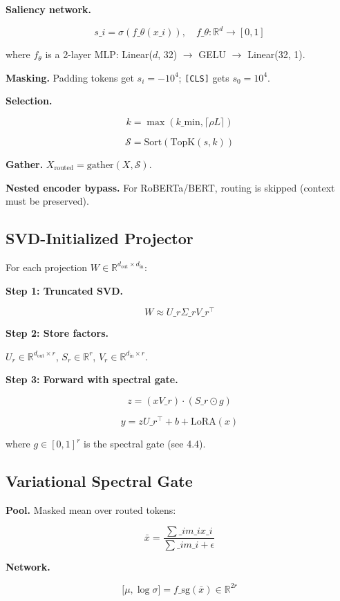 \textbf{Saliency network.}

\[
s\_i = \sigma(f\_\theta(x\_i)), \quad f\_\theta: \mathbb{R}^d \to [0, 1]
\tag{4.1}
\]

where $f_\theta$ is a 2-layer MLP: Linear($d$, 32) $\to$ GELU $\to$ Linear(32, 1).

\textbf{Masking.} Padding tokens get $s_i = -10^4$; \texttt{[CLS]} gets $s_0 = 10^4$.

\textbf{Selection.}

\[
k = \max(k\_\text{min}, \lceil \rho L \rceil)
\tag{4.2}
\]

\[
\mathcal{S} = \text{Sort}(\text{TopK}(s, k))
\tag{4.3}
\]

\textbf{Gather.} $X_\text{routed} = \text{gather}(X, \mathcal{S})$.

\textbf{Nested encoder bypass.} For RoBERTa/BERT, routing is skipped (context 
must be preserved).

\subsection{SVD-Initialized Projector}

For each projection $W \in \mathbb{R}^{d_\text{out} \times d_\text{in}}$:

\textbf{Step 1: Truncated SVD.}

\[
W \approx U\_r \Sigma\_r V\_r^\top
\tag{4.4}
\]

\textbf{Step 2: Store factors.}

$U_r \in \mathbb{R}^{d_\text{out} \times r}$, $S_r \in \mathbb{R}^r$, 
$V_r \in \mathbb{R}^{d_\text{in} \times r}$.

\textbf{Step 3: Forward with spectral gate.}

\[
z = (x V\_r) \cdot (S\_r \odot g)
\tag{4.5}
\]

\[
y = z U\_r^\top + b + \text{LoRA}(x)
\tag{4.6}
\]

where $g \in [0, 1]^r$ is the spectral gate (see  4.4).

\subsection{Variational Spectral Gate}

\textbf{Pool.} Masked mean over routed tokens:

\[
\bar{x} = \frac{\sum\_i m\_i x\_i}{\sum\_i m\_i + \epsilon}
\tag{4.7}
\]

\textbf{Network.}

\[
{[}\mu, \log \sigma] = f\_\text{sg}(\bar{x}) \in \mathbb{R}^{2r}
\tag{4.8}
\]


